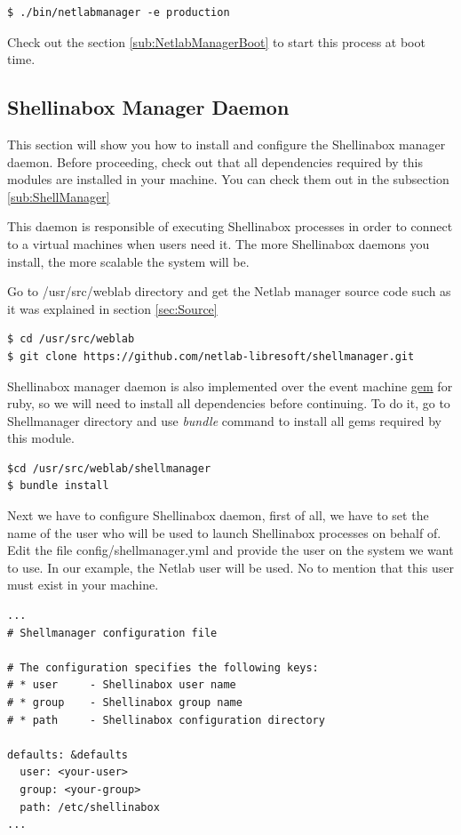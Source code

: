\documentclass{article}
\begin{document}
\begin{verbatim}
$ ./bin/netlabmanager -e production
\end{verbatim}

Check out the section \ref{sub:NetlabManagerBoot} to start this process at boot time.

\subsection{Shellinabox Manager Daemon}
This section will show you how to install and configure the Shellinabox manager daemon. Before proceeding, check out that all dependencies required by this modules are installed in your machine. You can check them out in the subsection \ref{sub:ShellManager}

This daemon is responsible of executing Shellinabox processes in order to connect to a virtual machines when users need it. The more Shellinabox daemons you install, the more scalable the system will be.

Go to /usr/src/weblab directory and get the Netlab manager source code such as it was explained in section \ref{sec:Source}

\begin{verbatim}
$ cd /usr/src/weblab
$ git clone https://github.com/netlab-libresoft/shellmanager.git
\end{verbatim}

Shellinabox manager daemon is also implemented over the event machine \href{http://rubyeventmachine.com/}{gem} for ruby, so we will need to install all dependencies before continuing. To do it, go to Shellmanager directory and use \textit{bundle} command to install all gems required by this module.

\begin{verbatim}
$cd /usr/src/weblab/shellmanager
$ bundle install
\end{verbatim}

Next we have to configure Shellinabox daemon, first of all, we have to set the name of the user who will be used to launch Shellinabox processes on behalf of. Edit the file config/shellmanager.yml and provide the user on the system we want to use. In our example, the Netlab user will be used. No to mention that this user must exist in your machine.

\begin{verbatim}
...
# Shellmanager configuration file

# The configuration specifies the following keys:
# * user     - Shellinabox user name
# * group    - Shellinabox group name
# * path     - Shellinabox configuration directory

defaults: &defaults
  user: <your-user>
  group: <your-group>
  path: /etc/shellinabox
...
\end{verbatim}
\end{document}
